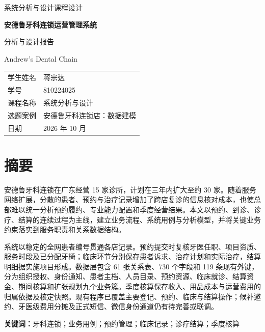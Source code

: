 \documentclass[12pt,a4paper,fontset=windows]{ctexart}
\begin{document}
\begin{titlepage}
\centering
\vspace*{24mm}
{\sffamily\large 系统分析与设计课程设计\par}
\vspace{28mm}
{\sffamily\fontsize{26}{34}\selectfont\bfseries 安德鲁牙科连锁运营管理系统\par}
\vspace{7mm}
{\sffamily\LARGE 分析与设计报告\par}
\vspace{8mm}
{\large Andrew's Dental Chain\par}
\vfill
\renewcommand{\arraystretch}{1.55}
\begin{tabular}{@{}L{27mm}L{77mm}@{}}
学生姓名 & 蒋宗达\\
学号 & 810224025\\
课程名称 & 系统分析与设计\\
选题案例 & 安德鲁牙科连锁店：数据建模\\
日期 & 2026 年 10 月\\
\end{tabular}
\vspace*{19mm}
\end{titlepage}
\section*{摘要}
安德鲁牙科连锁在广东经营 15 家诊所，计划在三年内扩大至约 30 家。随着服务网络扩展，分散的患者、预约与治疗记录增加了跨店复诊的信息核对成本，也使总部难以统一分析预约履约、专业能力配置和季度经营结果。本文以预约、到诊、诊疗、结算的连续过程为主线，建立业务流程、系统用例与分析模型，并将关键业务约束落实到服务职责和关系数据结构。

系统以稳定的全网患者编号贯通各店记录。预约提交时复核牙医任职、项目资质、服务时段及已分配牙椅；临床环节分别保存患者诉求、治疗计划和实际治疗，结算明细据实施项目形成。数据层包含 61 张关系表、730 个字段和 119 条现有外键，分为组织授权、身份通知、患者主档、人员目录、预约资源、临床就诊、结算资金、期间核算和扩张规划九个业务簇。季度核算保存收入、用品成本与运营费用的归属依据及核定快照。现有程序已覆盖主要登记、预约、临床与结算操作；候补邀约、牙医级费用分摊及正式短信、微信身份通道仍有待完善或联调。

\noindent\textbf{关键词：}牙科连锁；业务用例；预约管理；临床记录；诊疗结算；季度核算
\clearpage
\begingroup\small{}\tableofcontents\endgroup
\clearpage{}
\end{document}

